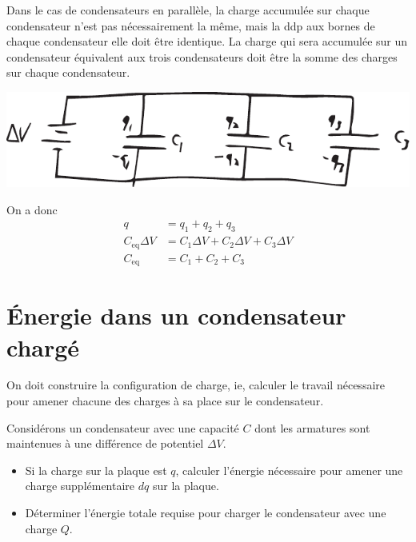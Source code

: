 
Dans le cas de condensateurs en parallèle, la charge accumulée sur chaque
condensateur n'est pas nécessairement la même, mais la ddp aux bornes de chaque
condensateur elle doit être identique. La charge qui sera accumulée sur un
condensateur équivalent aux trois condensateurs doit être la somme des charges
sur chaque condensateur.

\begin{center}
  \includegraphics[scale=0.5]{07-condensateurs/figures/condensateur-parallele.pdf}
\end{center}

On a donc
\begin{align*}
  q &= q_1 + q_2 + q_3  \\
  C_\mathrm{eq} \Delta V &= C_1 \Delta V + C_2 \Delta V + C_3 \Delta V  \\
  C_\mathrm{eq} &= C_1 + C_2 + C_3
\end{align*}


\section{Énergie dans un condensateur chargé}


On doit construire la configuration de charge, ie, calculer le travail
nécessaire pour amener chacune des charges à sa place sur le condensateur.

Considérons un condensateur avec une capacité $C$ dont les armatures sont
maintenues à une différence de potentiel $\Delta V$.

\begin{itemize}
  \item Si la charge sur la plaque est $q$, calculer l'énergie nécessaire pour
    amener une charge supplémentaire $dq$ sur la plaque.
  \item Déterminer l'énergie totale requise pour charger le condensateur avec
    une charge $Q$.
\end{itemize}


